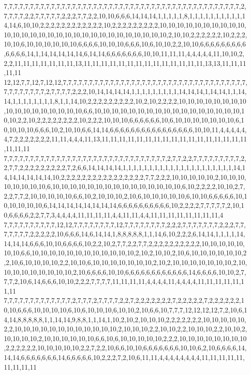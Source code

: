 7,7,7,7,7,7,7,7,7,7,7,7,7,7,7,7,7,7,7,7,7,7,7,7,7,7,7,7,7,7,7,7,7,7,7,7,7,7,7,7,7,7,7,7,7,2,7,7,7,7,2,2,7,7,7,7,7,2,2,2,7,7,2,2,10,10,6,6,6,14,14,14,1,1,1,1,1,8,1,1,1,1,1,1,1,1,1,1,14,14,6,10,10,2,2,2,2,2,2,2,2,2,2,2,2,10,2,2,2,2,2,2,2,2,2,10,10,10,10,10,10,10,10,10,10,10,10,10,10,10,10,10,10,10,10,10,10,10,10,10,10,10,10,10,2,10,10,2,2,2,2,2,2,10,2,2,2,10,10,6,10,10,10,10,10,10,6,6,6,6,10,10,10,6,6,6,10,6,10,10,2,2,10,10,6,6,6,6,6,6,6,6,6,6,6,6,6,14,1,14,14,14,14,14,6,14,14,6,6,6,6,6,6,6,10,10,11,11,11,4,4,4,4,4,11,10,10,2,2,2,11,11,11,11,11,11,11,13,11,11,11,11,11,11,11,11,11,11,11,11,11,11,13,13,11,11,11,11,11
12,12,7,7,12,7,12,12,7,7,7,7,7,7,7,7,7,7,7,7,7,7,7,7,7,7,7,7,7,7,7,7,7,7,7,7,7,7,7,7,7,7,7,7,7,7,7,7,7,7,7,2,7,7,7,7,2,2,2,10,14,14,14,14,1,1,1,1,1,1,1,1,1,14,14,14,1,14,14,1,1,14,14,1,1,1,1,1,1,1,1,8,1,1,14,10,2,2,2,2,2,2,2,2,2,10,2,10,2,2,2,2,10,10,10,10,10,10,10,10,10,10,10,10,10,10,10,10,10,6,6,10,10,10,10,10,10,10,10,10,10,10,10,10,10,10,10,10,10,10,2,2,10,2,2,2,2,2,2,2,2,10,2,2,2,10,10,10,6,6,6,6,6,6,10,6,10,10,10,10,10,10,10,6,10,10,10,10,6,6,6,10,2,10,10,6,6,14,14,6,6,6,6,6,6,6,6,6,6,6,6,6,6,6,6,10,10,11,4,4,4,4,4,4,7,2,2,2,2,2,2,2,11,11,4,4,4,11,13,11,11,11,11,11,11,11,11,11,11,11,11,11,11,11,11,11,11,11,11
7,7,7,7,7,7,7,7,7,7,7,7,7,7,7,7,7,7,7,7,7,7,7,7,7,7,7,7,7,7,7,2,7,7,2,2,7,7,7,7,7,7,7,7,7,2,2,7,7,2,2,2,2,2,2,2,2,2,7,2,6,6,14,14,14,14,1,1,1,1,1,1,1,1,1,1,1,1,1,1,1,1,1,1,1,1,1,14,14,14,14,14,14,14,10,2,2,2,2,2,2,2,2,2,2,2,2,2,2,2,2,7,7,2,2,2,10,10,10,10,10,2,10,10,10,10,10,10,10,10,6,10,10,10,10,10,10,10,10,10,10,10,10,10,10,10,6,10,2,2,2,2,10,10,2,7,2,2,7,7,2,10,10,10,10,10,6,6,10,2,10,10,10,2,10,6,10,10,10,10,10,6,10,10,6,6,6,6,6,10,10,10,10,10,10,6,14,14,14,14,14,14,14,14,6,6,6,6,6,6,6,6,6,6,10,2,2,2,2,7,7,7,7,7,2,10,10,6,6,6,6,2,2,7,7,3,4,4,4,4,11,11,11,11,4,4,11,11,4,4,11,11,11,11,11,11,11,11,4
7,7,7,7,7,7,7,7,7,7,12,12,7,7,7,7,7,7,7,7,12,7,7,7,7,7,7,7,7,2,2,2,7,7,7,7,7,7,7,2,2,2,7,7,7,7,7,7,7,2,2,2,2,2,10,6,6,6,14,6,14,14,1,8,8,8,8,8,1,1,14,6,10,2,2,2,6,14,14,1,1,1,1,14,14,14,14,6,6,6,10,10,6,6,6,6,10,2,2,10,2,7,7,2,2,7,7,2,2,2,2,2,2,2,2,2,2,10,10,10,10,10,10,10,6,6,10,10,10,10,10,10,10,10,10,10,10,10,2,10,2,10,10,2,10,6,10,10,10,10,10,10,2,2,10,6,10,10,10,10,2,2,10,10,6,10,10,10,10,10,10,10,2,10,2,10,10,10,10,10,10,10,2,10,10,10,10,10,10,10,10,10,2,10,6,6,6,6,10,10,6,6,6,6,6,6,6,6,6,6,6,6,14,6,6,6,6,10,10,2,7,7,7,2,10,6,14,6,6,6,10,10,2,2,2,7,7,7,7,11,11,11,11,4,4,4,4,11,4,4,4,4,11,11,11,11,11,11,11
7,7,7,7,7,7,7,7,7,7,7,7,7,2,7,7,7,2,7,7,7,7,2,2,7,2,2,2,2,2,2,2,7,2,2,2,2,2,7,2,2,2,2,2,2,10,10,6,6,6,10,10,10,10,6,10,6,10,10,10,6,10,10,2,10,6,6,10,7,7,7,12,12,12,12,7,2,10,6,14,14,8,8,8,8,8,1,1,14,14,9,8,8,1,1,14,1,10,2,10,2,10,10,10,2,2,2,2,2,2,2,10,10,10,10,10,2,2,10,10,10,10,10,10,10,10,10,10,10,10,2,10,10,10,2,2,10,10,2,2,10,10,10,2,2,10,10,2,10,10,10,10,2,10,10,10,10,10,10,6,6,10,6,10,10,10,10,10,2,2,2,10,10,10,10,10,10,10,10,2,2,2,2,2,2,10,10,10,10,10,2,2,7,2,2,10,6,6,10,10,6,6,6,6,6,6,6,10,10,6,2,10,6,6,6,6,14,14,14,6,6,6,6,6,6,6,14,6,6,6,6,6,10,2,2,2,7,2,10,6,11,11,4,4,4,4,4,4,4,4,11,11,11,11,11,11,11,11,11
